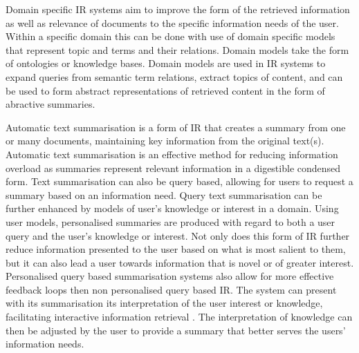 Domain specific IR systems aim to improve the form of the retrieved information as well as relevance of documents to the specific information needs of the user. Within a specific domain this can be done with use of domain specific models that represent topic and terms and their relations. Domain models take the form of ontologies or knowledge bases. Domain models are used in IR systems to expand queries from semantic term relations, extract topics of content, and can be used to form abstract representations of retrieved content in the form of abractive summaries. 

Automatic text summarisation is a form of IR that creates a summary from one or many documents, maintaining key information from the original text(s). Automatic text summarisation is an effective method for reducing information overload as summaries represent relevant information in a digestible condensed form. Text summarisation can also be query based, allowing for users to request a summary based on an information need. Query text summarisation can be further enhanced by models of user's knowledge or interest in a domain. Using user models, personalised summaries are produced with regard to both a user query and the user's knowledge or interest. Not only does this form of IR further reduce information presented to the user based on what is most salient to them, but it can also lead a user towards information that is novel or of greater interest. Personalised query based summarisation systems also allow for more effective feedback loops then non personalised query based IR. The system can present with its summarisation its interpretation of the user interest or knowledge, facilitating interactive information retrieval \citep{chiaramella2000information}. The interpretation of knowledge can then be adjusted by the user to provide a summary that better serves the users' information needs.

